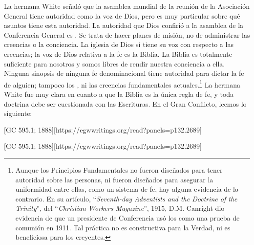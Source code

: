 La hermana White señaló que la asamblea mundial de la reunión de la Asociación General tiene autoridad como la voz de Dios, pero es muy particular sobre qué asuntos tiene esta autoridad. La autoridad que Dios confirió a la asamblea de la Conferencia General es . Se trata de hacer planes de misión, no de administrar las creencias o la conciencia. La iglesia de Dios sí tiene su voz con respecto a las creencias; la voz de Dios relativa a la fe es la Biblia. La Biblia es totalmente suficiente para nosotros y somos libres de rendir nuestra conciencia a ella. Ninguna sinopsis de ninguna fe denominacional tiene autoridad para dictar la fe de alguien; tampoco los , ni las creencias fundamentales actuales.\footnote{Aunque los Principios Fundamentales no fueron diseñados para tener autoridad sobre las personas, ni fueron diseñados para asegurar la uniformidad entre ellas, como un sistema de fe, hay alguna evidencia de lo contrario. En su artículo, “\textit{Seventh-day Adventists and the Doctrine of the Trinity}”, del “\textit{Christian Workers Magazine}”, 1915, D.M. Canright dio evidencia de que un presidente de Conferencia usó los  como una prueba de comunión en 1911. Tal práctica no es constructiva para la Verdad, ni es beneficiosa para los creyentes.} La hermana White fue muy clara en cuanto a que la Biblia es la única regla de fe, y toda doctrina debe ser cuestionada con las Escrituras. En el Gran Conflicto, leemos lo siguiente:


[GC 595.1; 1888][https://egwwritings.org/read?panels=p132.2689]


[GC 595.1; 1888][https://egwwritings.org/read?panels=p132.2689]


